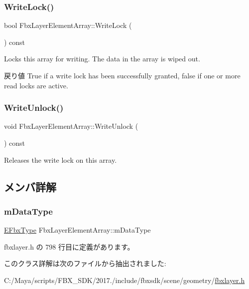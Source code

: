 \subsubsection{\texorpdfstring{Write\+Lock()}{WriteLock()}}
{\footnotesize\ttfamily bool Fbx\+Layer\+Element\+Array\+::\+Write\+Lock (\begin{DoxyParamCaption}{ }\end{DoxyParamCaption}) const}

Locks this array for writing. The data in the array is wiped out. \begin{DoxyReturn}{戻り値}
{\ttfamily True} if a write lock has been successfully granted, {\ttfamily false} if one or more read locks are active. 
\end{DoxyReturn}
\mbox{\label{class_fbx_layer_element_array_a519b1b44abd526e00c6ee9e4f3a38e2d}} 
\subsubsection{\texorpdfstring{Write\+Unlock()}{WriteUnlock()}}
{\footnotesize\ttfamily void Fbx\+Layer\+Element\+Array\+::\+Write\+Unlock (\begin{DoxyParamCaption}{ }\end{DoxyParamCaption}) const}

Releases the write lock on this array. 

\subsection{メンバ詳解}
\mbox{\label{class_fbx_layer_element_array_a47930d23e0f3e596bee667ffe900268b}} 
\subsubsection{\texorpdfstring{m\+Data\+Type}{mDataType}}
{\footnotesize\ttfamily \hyperlink{fbxpropertytypes_8h_a73913a5ddfb20e57c6f25e9e6784bd92}{E\+Fbx\+Type} Fbx\+Layer\+Element\+Array\+::m\+Data\+Type\hspace{0.3cm}{\ttfamily [protected]}}



 fbxlayer.\+h の 798 行目に定義があります。



このクラス詳解は次のファイルから抽出されました\+:\begin{DoxyCompactItemize}
\item 
C\+:/\+Maya/scripts/\+F\+B\+X\+\_\+\+S\+D\+K/2017./include/fbxsdk/scene/geometry/\hyperlink{fbxlayer_8h}{fbxlayer.\+h}\end{DoxyCompactItemize}
